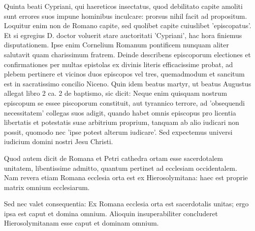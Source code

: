 Quinta beati Cypriani, qui haereticos insectatus, quod debilitato capite amoliti sunt errores suos impune hominibus inculcare: prorsus nihil facit ad propositum. Loquitur enim non de Romano capite, sed quolibet capite cuiuslibet 'episcopatus'. Et si egregius D. doctor voluerit stare auctoritati 'Cypriani', hac hora finiemus disputationem. Ipse enim Cornelium Romanum pontificem nunquam aliter salutavit quam charissimum fratrem. Deinde describens episcoporum electiones et confirmationes per multas epistolas ex divinis literis efficacissime probat, ad plebem pertinere et vicinos duos episcopos vel tres, quemadmodum et sancitum est in sacratissimo concilio Niceno. Quin idem beatus martyr, ut beatus Augustus allegat libro 2 ca. 2 de baptismo, sic dicit: Neque enim quisquam nostrum episcopum se essee piscoporum constituit, aut tyrannico terrore, ad 'obsequendi necessitatem' collegas suos adigit, quando habet omnis episcopus pro licentia libertatis et potestatis suae arbitrium proprium, tanquam ab alio iudicari non possit, quomodo nec 'ipse potest alterum iudicare'. Sed expectemus universi iudicium domini nostri Jesu Christi.

Quod autem dicit de Romana et Petri cathedra ortam esse sacerdotalem unitatem, libentissime admitto, quantum pertinet ad ecclesiam occidentalem. Nam revera etiam Romana ecclesia orta est ex Hierosolymitana: haec est proprie matrix omnium ecclesiarum.

Sed nec valet consequentia: Ex Romana ecclesia orta est sacerdotalis unitas; ergo ipsa est caput et domina omnium. Alioquin insuperabiliter concluderet Hierosolymitanam esse caput et dominam omnium.


